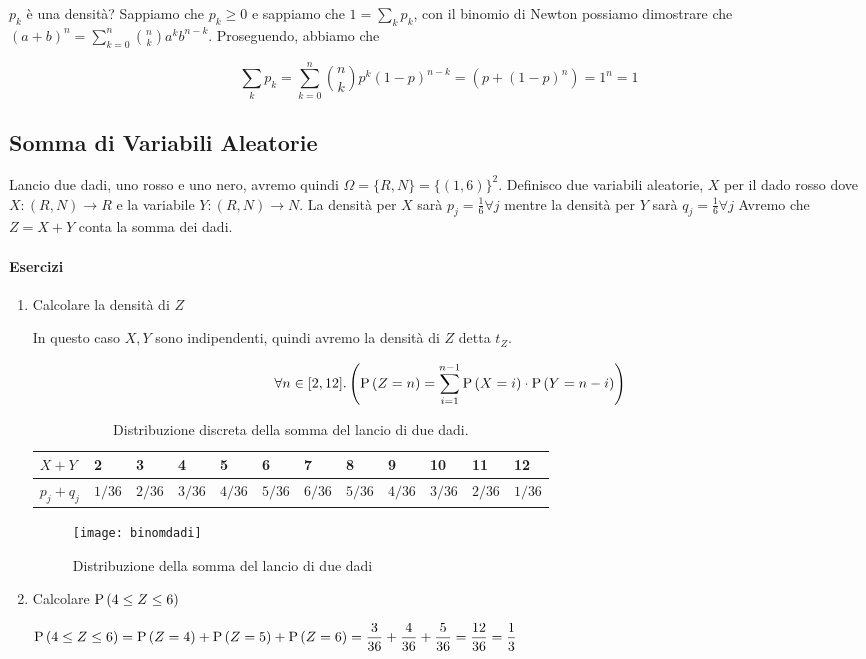 $ p_k $ è una densità? Sappiamo che $ p_k \geq 0 $ e sappiamo che $ 1 = \sum_{k} p_k $, con il binomio di Newton possiamo dimostrare che $ (a+b)^n = \sum_{k=0}^{n} \binom{n}{k} a^k b^{n-k} $. Proseguendo, abbiamo che 

\[ \sum_{k} p_k = \sum_{k=0}^{n} \binom{n}{k} p^k (1-p)^{n-k} = (p+(1-p)^n) = 1^n = 1 \]

\subsection{Somma di Variabili Aleatorie}
Lancio due dadi, uno rosso e uno nero, avremo quindi $ \Omega = \{R, N\} = \{(1,6)\}^2 $. Definisco due variabili aleatorie, $ X $ per il dado rosso dove $ X : (R, N) \to R $ e la variabile $ Y : (R, N) \to N $. La densità per $ X $ sarà $ p_j = \frac{1}{6} \forall j $ mentre la densità per $ Y $ sarà $ q_j = \frac{1}{6} \forall j $
Avremo che $ Z = X + Y $ conta la somma dei dadi.

\paragraph{Esercizi}
\begin{enumerate}
	\item Calcolare la densità di $ Z $
		
		In questo caso $ X, Y $ sono indipendenti, quindi avremo la densità di $ Z $ detta $ t_Z $.
		
		\[ \forall n \in [2, 12] .  \left( \text{P}\left(Z = n\right) = \sum_{i=1}^{n-1} \text{P}\left(X = i\right) \cdot \text{P}\left(Y = n - i\right) \right) \]
		
		\begin{table}[H]
			\centering
			\caption{Distribuzione discreta della somma del lancio di due dadi.}
			\label{tab:distribdice1}
			\begin{tabular}{|l|l|l|l|l|l|l|l|l|l|l|l|}
				\hline
				$ X + Y $     & 2        & 3        & 4        & 5        & 6        & 7        & 8        & 9        & 10       & 11       & 12       \\ \hline
				$ p_j + q_j $ & $ 1/36 $ & $ 2/36 $ & $ 3/36 $ & $ 4/36 $ & $ 5/36 $ & $ 6/36 $ & $ 5/36 $ & $ 4/36 $ & $ 3/36 $ & $ 2/36 $ & $ 1/36 $ \\ \hline
			\end{tabular}
		\end{table}
	
	\begin{figure}[H]
		\centering
		\caption{Distribuzione della somma del lancio di due dadi}
		\texttt{[image: binomdadi]}
	\end{figure}
		
	\item Calcolare $ \text{P}\left(4 \leq Z \leq 6\right) $
	
	$ \text{P}\left(4 \leq Z \leq 6\right) = \text{P}\left(Z = 4\right) + \text{P}\left(Z = 5\right) + \text{P}\left(Z = 6\right) = \dfrac{3}{36} + \dfrac{4}{36} + \dfrac{5}{36} = \dfrac{12}{36} = \dfrac{1}{3} $
\end{enumerate}

